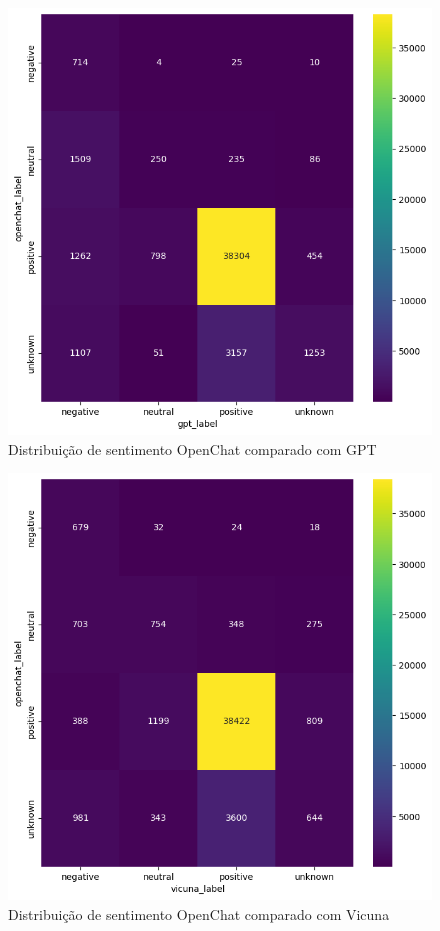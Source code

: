 \begin{figure}
	\centering
	\includegraphics[width=.8\textwidth]{figs/openchat/heat_vs_gpt.png}
	\caption{Distribuição de sentimento OpenChat comparado com GPT}
	\label{img:heat_openchat_vs_gpt}
\end{figure}

\begin{figure}
	\centering
	\includegraphics[width=.8\textwidth]{figs/openchat/heat_vs_vicuna.png}
	\caption{Distribuição de sentimento OpenChat comparado com Vicuna}
	\label{img:heat_openchat_vs_vicuna}
\end{figure}

